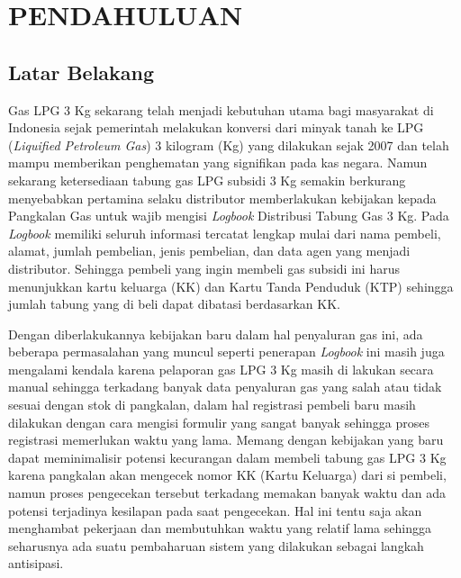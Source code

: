 
\chapter{PENDAHULUAN}

\section{Latar Belakang}
Gas LPG 3 Kg sekarang telah menjadi kebutuhan utama bagi masyarakat di Indonesia sejak pemerintah melakukan konversi dari minyak tanah ke LPG (\textit{Liquified Petroleum Gas}) 3 kilogram (Kg) yang dilakukan sejak 2007 dan telah mampu memberikan penghematan yang signifikan pada kas negara. Namun sekarang ketersediaan tabung gas LPG subsidi 3 Kg semakin berkurang menyebabkan pertamina selaku distributor memberlakukan kebijakan kepada Pangkalan Gas untuk wajib mengisi \textit{Logbook} Distribusi Tabung Gas 3 Kg. Pada \textit{Logbook} memiliki seluruh informasi tercatat lengkap mulai dari nama pembeli, alamat, jumlah pembelian, jenis pembelian, dan data agen yang menjadi distributor. Sehingga  pembeli yang ingin membeli gas subsidi ini harus menunjukkan kartu keluarga (KK) dan Kartu Tanda Penduduk (KTP) sehingga jumlah tabung yang di beli dapat dibatasi berdasarkan KK.
\par Dengan diberlakukannya kebijakan baru dalam hal penyaluran gas ini, ada beberapa permasalahan yang muncul seperti penerapan \textit{Logbook} ini masih juga mengalami kendala karena pelaporan gas LPG 3 Kg masih di lakukan secara manual sehingga terkadang banyak data penyaluran gas yang salah atau tidak sesuai dengan stok di pangkalan, dalam hal registrasi pembeli baru masih dilakukan dengan cara mengisi formulir yang sangat banyak sehingga proses registrasi memerlukan waktu yang lama. Memang dengan kebijakan yang baru dapat meminimalisir potensi kecurangan dalam membeli tabung gas LPG 3 Kg karena pangkalan akan mengecek nomor KK (Kartu Keluarga) dari si pembeli, namun proses pengecekan tersebut terkadang memakan banyak waktu dan ada potensi terjadinya kesilapan pada saat pengecekan.  Hal ini tentu saja akan menghambat pekerjaan dan membutuhkan waktu yang relatif lama sehingga seharusnya ada suatu pembaharuan sistem yang dilakukan sebagai langkah antisipasi.
